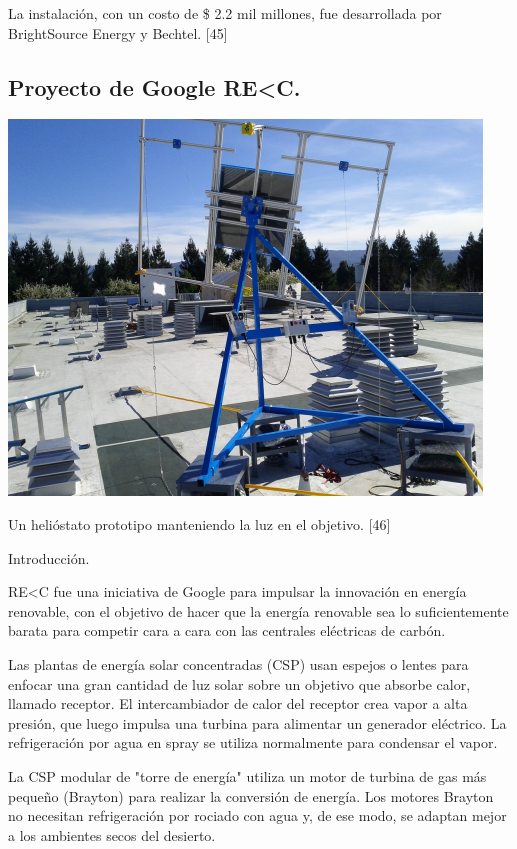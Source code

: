 \documentclass[12pt]{article}
\begin{document}
La instalación, con un costo de \$ 2.2 mil millones, fue desarrollada por BrightSource Energy y Bechtel. [45]



\subsection{Proyecto de Google RE\textless C.}

\includegraphics{HeliostatoGoogle}

Un helióstato prototipo manteniendo la luz en el objetivo. [46]

Introducción.

RE\textless C fue una iniciativa de Google para impulsar la innovación en energía renovable, con el objetivo de hacer que la energía renovable sea lo suficientemente barata para competir cara a cara con las centrales eléctricas de carbón.

Las plantas de energía solar concentradas (CSP) usan espejos o lentes para enfocar una gran cantidad de luz solar sobre un objetivo que absorbe calor, llamado receptor. El intercambiador de calor del receptor crea vapor a alta presión, que luego impulsa una turbina para alimentar un generador eléctrico. La refrigeración por agua en spray se utiliza normalmente para condensar el vapor.

La CSP modular de "torre de energía" utiliza un motor de turbina de gas más pequeño (Brayton) para realizar la conversión de energía. Los motores Brayton no necesitan refrigeración por rociado con agua y, de ese modo, se adaptan mejor a los ambientes secos del desierto.
\end{document}
